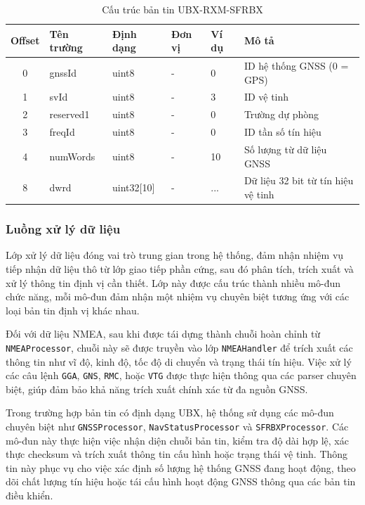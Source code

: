 \documentclass[../DoAn.tex]{subfiles}
\begin{document}
\begin{table}[H]
\centering
\begin{tabular}{|c|l|l|l|l|p{6cm}|}
\hline
\textbf{Offset} & \textbf{Tên trường} & \textbf{Định dạng} & \textbf{Đơn vị} & \textbf{Ví dụ} & \textbf{Mô tả} \\
\hline
0 & gnssId & uint8 & - & 0 & ID hệ thống GNSS (0 = GPS) \\
\hline
1 & svId & uint8 & - & 3 & ID vệ tinh \\
\hline
2 & reserved1 & uint8 & - & 0 & Trường dự phòng \\
\hline
3 & freqId & uint8 & - & 0 & ID tần số tín hiệu \\
\hline
4 & numWords & uint8 & - & 10 & Số lượng từ dữ liệu GNSS \\
\hline
8 & dwrd & uint32[10] & - & ... & Dữ liệu 32 bit từ tín hiệu vệ tinh \\
\hline
\end{tabular}
\caption{Cấu trúc bản tin UBX-RXM-SFRBX}
\end{table}


\subsubsection{Luồng xử lý dữ liệu}
\label{subsubsection:4.2.2.2}
Lớp xử lý dữ liệu đóng vai trò trung gian trong hệ thống, đảm nhận nhiệm vụ tiếp nhận dữ liệu thô từ lớp giao tiếp phần cứng, sau đó phân tích, trích xuất và xử lý thông tin định vị cần thiết. Lớp này được cấu trúc thành nhiều mô-đun chức năng, mỗi mô-đun đảm nhận một nhiệm vụ chuyên biệt tương ứng với các loại bản tin định vị khác nhau.

Đối với dữ liệu NMEA, sau khi được tái dựng thành chuỗi hoàn chỉnh từ \texttt{NMEAProcessor}, chuỗi này sẽ được truyền vào lớp \texttt{NMEAHandler} để trích xuất các thông tin như vĩ độ, kinh độ, tốc độ di chuyển và trạng thái tín hiệu. Việc xử lý các câu lệnh \texttt{GGA}, \texttt{GNS}, \texttt{RMC}, hoặc \texttt{VTG} được thực hiện thông qua các parser chuyên biệt, giúp đảm bảo khả năng trích xuất chính xác từ đa nguồn GNSS.

Trong trường hợp bản tin có định dạng UBX, hệ thống sử dụng các mô-đun chuyên biệt như \texttt{GNSSProcessor}, \texttt{NavStatusProcessor} và \texttt{SFRBXProcessor}. Các mô-đun này thực hiện việc nhận diện chuỗi bản tin, kiểm tra độ dài hợp lệ, xác thực checksum và trích xuất thông tin cấu hình hoặc trạng thái vệ tinh. Thông tin này phục vụ cho việc xác định số lượng hệ thống GNSS đang hoạt động, theo dõi chất lượng tín hiệu hoặc tái cấu hình hoạt động GNSS thông qua các bản tin điều khiển.
\end{document}
